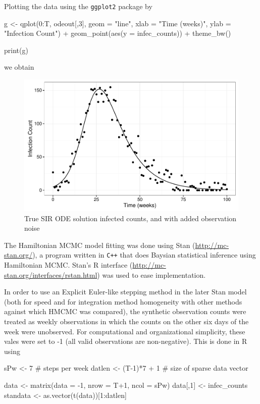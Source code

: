     Plotting the data using the \verb|ggplot2| package by

    \begin{R}
	g <- qplot(0:T, odeout[,3], geom = "line", xlab = "Time (weeks)", ylab = "Infection Count") +
		geom_point(aes(y = infec_counts)) +
		theme_bw()

	print(g)
    \end{R}

    we obtain

    \begin{figure}[H]
        \centering
        \includegraphics[width=\textwidth]{./images/dataplot.pdf}
        \caption{True SIR ODE solution infected counts, and with added observation noise}
        \label{dataplot}
    \end{figure}

    The Hamiltonian MCMC model fitting was done using Stan (\url{http://mc-stan.org/}), a program written in \verb|C++| that does Baysian statistical inference using Hamiltonian MCMC. Stan's R interface (\url{http://mc-stan.org/interfaces/rstan.html}) was used to ease implementation.

    In order to use an Explicit Euler-like stepping method in the later Stan model (both for speed and for integration method homogeneity with other methods against which HMCMC was compared), the synthetic observation counts were treated as weekly observations in which the counts on the other six days of the week were unobserved. For computational and organizational simplicity, these vales were set to -1 (all valid observations are non-negative). This is done in R using

    \begin{R}
    sPw <- 7               # steps per week
    datlen <- (T-1)*7 + 1  # size of sparse data vector

    data <- matrix(data = -1, nrow = T+1, ncol = sPw)
    data[,1] <- infec_counts
    standata <- as.vector(t(data))[1:datlen]
    \end{R}

